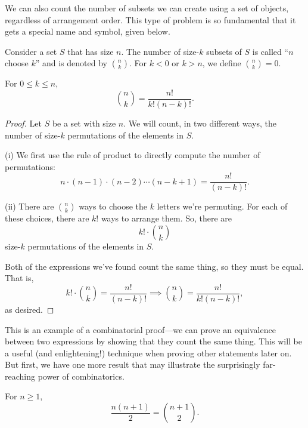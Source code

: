 \documentclass[../m055main.tex]{subfiles}
\begin{document}
We can also count the number of subsets we can create using a set of objects, regardless of arrangement order.
This type of problem is so fundamental that it gets a special name and symbol, given below.

\begin{definition}[Combination]
    Consider a set $S$ that has size $n$.
    The number of size-$k$ subsets of $S$ is called ``$n$ choose $k$'' and is denoted by ${n \choose k}$.
    For $k < 0$ or $k > n$, we define ${n \choose k} = 0$.
\end{definition}

\pagebreak

\begin{theorem}
    For $0 \leq k \leq n$,
    \[ {n \choose k} = \frac{n!}{k! (n-k)!}. \]
\end{theorem}

\begin{proof}
    Let $S$ be a set with size $n$.
    We will count, in two different ways, the number of size-$k$ permutations of the elements in $S$.
    \smallskip

    (i) We first use the rule of product to directly compute the number of permutations:
    \[ n \cdot (n-1) \cdot (n-2) \cdots (n-k+1) = \frac{n!}{(n-k)!}. \]

    (ii) There are ${n \choose k}$ ways to choose the $k$ letters we're permuting.
    For each of these choices, there are $k!$ ways to arrange them.
    So, there are
    \[ k! \cdot {n \choose k} \]
    size-$k$ permutations of the elements in $S$.
    \smallskip

    Both of the expressions we've found count the same thing, so they must be equal.
    That is,
    \[ k! \cdot {n \choose k} = \frac{n!}{(n-k)!} \implies {n \choose k} = \frac{n!}{k!(n-k)!}, \]
    as desired.
\end{proof}

This is an example of a combinatorial proof---we can prove an equivalence between two expressions by showing that they count the same thing.
This will be a useful (and enlightening!) technique when proving other statements later on.
But first, we have one more result that may illustrate the surprisingly far-reaching power of combinatorics.

\begin{theorem}[]
    For $n \geq 1$,
    \[ \frac{n(n+1)}{2} = {n+1 \choose 2}. \]
\end{theorem}
\end{document}
